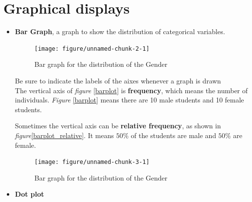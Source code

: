 \documentclass[a4paper, 12pt,twoside]{book}\usepackage[]{graphicx}\usepackage[]{color}
\newenvironment{knitrout}{}{} %
\begin{document}
\section{Graphical displays}
\begin{itemize}

\item \textbf{Bar Graph}, a graph to show the distribution of \colorbox{babypink}{categorical variables}.

\begin{knitrout}
\color{fgcolor}\begin{figure}[H]

{\centering \texttt{[image: figure/unnamed-chunk-2-1]} 

}

\caption[\label{barplot} Bar graph for the distribution of the Gender]{\label{barplot} Bar graph for the distribution of the Gender}\label{fig:unnamed-chunk-2}
\end{figure}


\end{knitrout}
\colorbox{babypink}{Be sure to indicate the labels of the aixes whenever a graph is drawn}\\

The vertical axis of \textit{figure} \ref{barplot}  is \textbf{frequency}, which means the number of individuals. \textit{Figure} \ref{barplot} means there are 10 male students and 10 female students. 

Sometimes the vertical axis can be \textbf{relative frequency}, as shown in \textit{figure}\ref{barplot_relative}. It means $50\%$ of the students are male and $50\%$ are female.
\begin{knitrout}
\color{fgcolor}\begin{figure}[H]

{\centering \texttt{[image: figure/unnamed-chunk-3-1]} 

}

\caption[\label{barplot_relative} Bar graph for the distribution of the Gender]{\label{barplot_relative} Bar graph for the distribution of the Gender}\label{fig:unnamed-chunk-3}
\end{figure}


\end{knitrout}
\item \textbf{Dot plot}
\begin{knitrout}
\color{fgcolor}\begin{figure}[H]


\end{figure}
\end{knitrout}
\end{itemize}
\end{document}
